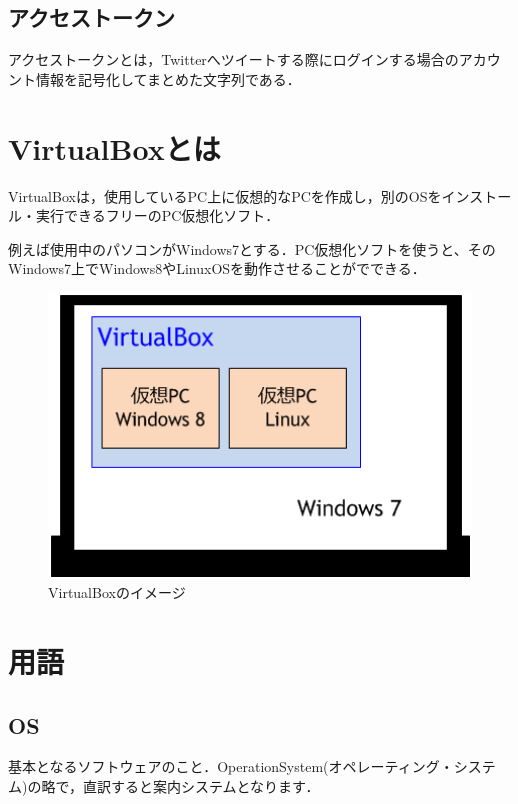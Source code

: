 \subsection{アクセストークン}

アクセストークンとは，Twitterへツイートする際にログインする場合のアカウント情報を記号化してまとめた文字列である．





\section{VirtualBoxとは}
VirtualBoxは，使用しているPC上に仮想的なPCを作成し，別のOSをインストール・実行できるフリーのPC仮想化ソフト．

例えば使用中のパソコンがWindows7とする．PC仮想化ソフトを使うと、そのWindows7上でWindows8やLinuxOSを動作させることがでできる\cite{VirtualBox}．
\begin{figure}[H]
\centering
\includegraphics[width=15cm]{virtualbox00.png}
\caption{VirtualBoxのイメージ}\label{VirtualBoxのイメージ}
\end{figure}



\section{用語}

\subsection{OS}

基本となるソフトウェアのこと．OperationSystem(オペレーティング・システム)の略で，直訳すると案内システムとなります．

